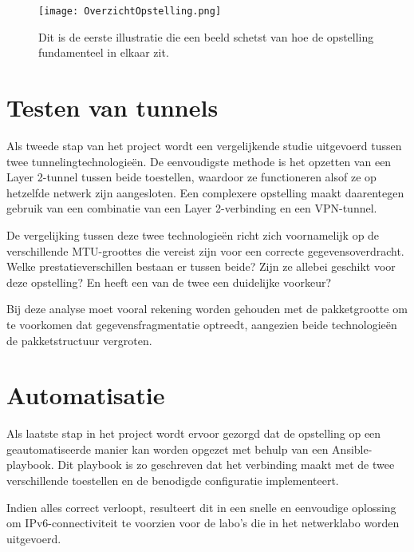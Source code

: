 \begin{figure}[H]
    \centering
    \texttt{[image: OverzichtOpstelling.png]}
    \caption[Overzicht van de opstelling.]{\label{fig:opstelling}Dit is de eerste illustratie die een beeld schetst van hoe de opstelling fundamenteel in elkaar zit.}
\end{figure}

\section{Testen van tunnels}
\label{sec:testen van tunnels}

Als tweede stap van het project wordt een vergelijkende studie uitgevoerd tussen twee tunnelingtechnologieën.  
De eenvoudigste methode is het opzetten van een Layer 2-tunnel tussen beide toestellen, waardoor ze functioneren alsof ze op hetzelfde netwerk zijn aangesloten.  
Een complexere opstelling maakt daarentegen gebruik van een combinatie van een Layer 2-verbinding en een VPN-tunnel.  

De vergelijking tussen deze twee technologieën richt zich voornamelijk op de verschillende MTU-groottes die vereist zijn voor een correcte gegevensoverdracht.  
Welke prestatieverschillen bestaan er tussen beide? Zijn ze allebei geschikt voor deze opstelling? En heeft een van de twee een duidelijke voorkeur?  

Bij deze analyse moet vooral rekening worden gehouden met de pakketgrootte om te voorkomen dat gegevensfragmentatie optreedt, aangezien beide technologieën de pakketstructuur vergroten.

\section{Automatisatie}
\label{sec:automatisatie}

Als laatste stap in het project wordt ervoor gezorgd dat de opstelling op een geautomatiseerde manier kan worden opgezet met behulp van een Ansible-playbook.  
Dit playbook is zo geschreven dat het verbinding maakt met de twee verschillende toestellen en de benodigde configuratie implementeert.  

Indien alles correct verloopt, resulteert dit in een snelle en eenvoudige oplossing om IPv6-connectiviteit te voorzien voor de labo’s die in het netwerklabo worden uitgevoerd.